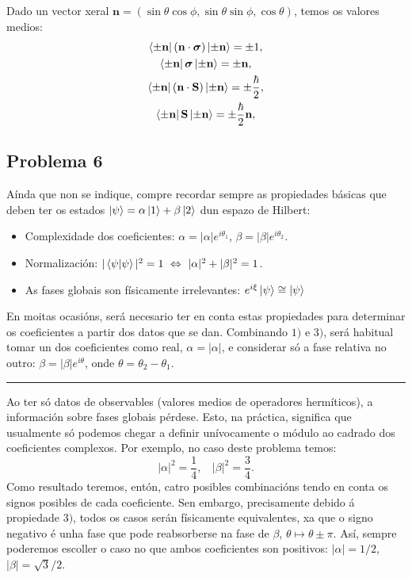 \documentclass[a4paper,12pt]{article}
\begin{document}
Dado un vector xeral $\textbf{n} = (\sin\theta \cos \phi, \sin\theta \sin\phi, \cos\theta)$, temos os valores medios:
\begin{equation}
\begin{gathered}
	\bra{\pm \textbf{n}} (\textbf{n} \cdot \bm{\sigma}) \ket{\pm \textbf{n}} = \pm 1, \\
	\bra{\pm \textbf{n}} \bm{\sigma} \ket{\pm \textbf{n}} = \pm \textbf{n}, \\
	\bra{\pm \textbf{n}} (\textbf{n} \cdot \textbf{S}) \ket{\pm \textbf{n}} = \pm \frac{\hbar}{2}, \\
	\bra{\pm \textbf{n}} \textbf{S} \ket{\pm \textbf{n}} = \pm \frac{\hbar}{2}\textbf{n},
\end{gathered}
\end{equation}

\subsection*{Problema 6}

Aínda que non se indique, compre recordar sempre as propiedades básicas que deben ter os estados $\ket{\psi} = \alpha \ket{1} + \beta\ket{2}$ dun espazo de Hilbert:
\begin{itemize}
	\item[$1)$] Complexidade dos coeficientes: $\alpha = |\alpha| e^{i\theta_1}$, $\beta = |\beta|e^{i\theta_2}$.
	\item[$2)$] Normalización: $|\braket{\psi}{\psi}|^2 = 1 ~\Leftrightarrow~ |\alpha|^2 + |\beta|^2 = 1$.
	\item[$3)$] As fases globais son físicamente irrelevantes: $e^{i\xi} \ket{\psi} \cong \ket{\psi}$
\end{itemize}
\noindent
En moitas ocasións, será necesario ter en conta estas propiedades para determinar os coeficientes a partir dos datos que se dan.
Combinando $1)$ e $3)$, será habitual tomar un dos coeficientes como real, $\alpha = |\alpha|$, e considerar só a fase relativa no outro: $\beta = |\beta|e^{i\theta}$, onde $\theta = \theta_2 - \theta_1$.

\begin{center} \hrule \end{center}

Ao ter só datos de observables (valores medios de operadores hermíticos), a información sobre fases globais pérdese. Esto, na práctica, significa que usualmente só podemos chegar a definir unívocamente o módulo ao cadrado dos coeficientes complexos. Por exemplo, no caso deste problema temos:
\begin{equation}
	|\alpha|^2 = \frac{1}{4}, ~~~~ |\beta|^2 = \frac{3}{4}.
\end{equation}
\noindent
Como resultado teremos, entón, catro posibles combinacións tendo en conta os signos posibles de cada coeficiente. Sen embargo, precisamente debido á propiedade $3)$, todos os casos serán físicamente equivalentes, xa que o signo negativo é unha fase que pode reabsorberse na fase de $\beta$, $\theta \mapsto \theta \pm \pi$. Así, sempre poderemos escoller o caso no que ambos coeficientes son positivos: $|\alpha|= 1/2$, $|\beta| = \sqrt{3}/2$. 
\end{document}
